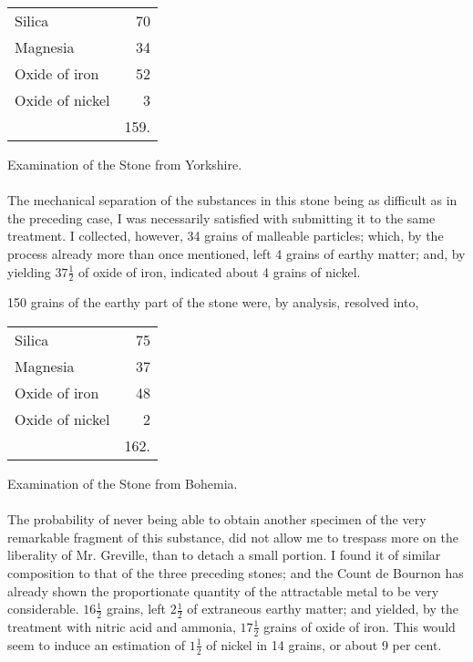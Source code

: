 \documentclass[a4paper, 12pt, oneside]{article}
\begin{document}
\begin{table}[H]
    \centering
    \begin{tabular}{l r}
        Silica & 70 \\
        Magnesia & 34 \\
        Oxide of iron & 52 \\
        Oxide of nickel & 3 \\ \hline
        ~ & 159. \\
    \end{tabular}
\end{table}
\begin{center}
Examination of the Stone from Yorkshire.
\end{center}
\paragraph{}
The mechanical separation of the substances in this stone being as difficult as in the preceding case, I was necessarily satisfied with submitting it to the same treatment. I collected, however, 34 grains of malleable particles; which, by the process already more than once mentioned, left 4 grains of earthy matter; and, by yielding $37\frac{1}{2}$ of oxide of iron, indicated about 4 grains of nickel.

150 grains of the earthy part of the stone were, by analysis, resolved into,
\begin{table}[H]
    \centering
    \begin{tabular}{l r}
        Silica & 75 \\
        Magnesia & 37 \\
        Oxide of iron & 48 \\
        Oxide of nickel & 2 \\ \hline
        ~ & 162. \\
    \end{tabular}
\end{table}
\begin{center}
Examination of the Stone from Bohemia.
\end{center}
\paragraph{}
The probability of never being able to obtain another specimen of the very remarkable fragment of this substance, did not allow me to trespass more on the liberality of Mr. Greville, than to detach a small portion. I found it of similar composition to that of the three preceding stones; and the Count de Bournon has already shown the proportionate quantity of the attractable metal to be very considerable. $16\frac{1}{2}$ grains, left $2\frac{1}{2}$ of extraneous earthy matter; and yielded, by the treatment with nitric acid and ammonia, $17\frac{1}{2}$ grains of oxide of iron. This would seem to induce an estimation of $1\frac{1}{2}$ of nickel in 14 grains, or about 9 per cent.
\end{document}
